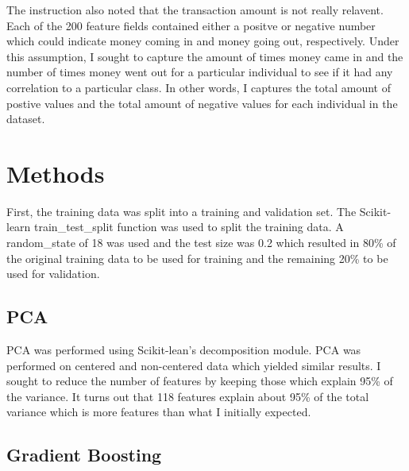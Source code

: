 \documentclass[11pt,letterpaper]{article}
\begin{document}

The instruction also noted that the transaction amount is not really relavent.
Each of the 200 feature fields contained either a positve or negative number
which could indicate money coming in and money going out, respectively.  Under
this assumption, I sought to capture the amount of times money came in and the
number of times money went out for a particular individual to see if it had any
correlation to a particular class.  In other words, I captures the total amount
of postive values and the total amount of negative values for each individual in
the dataset.  

\section{Methods}

First, the training data was split into a training and validation set.  The
Scikit-learn train\_test\_split function was used to split the training data.  A
random\_state of 18 was used and the test size was 0.2 which resulted in 80\% of
the original training data to be used for training and the remaining 20\% to be
used for validation.  

\subsection{PCA}
PCA was performed using Scikit-lean's decomposition module.  PCA was performed
on centered and non-centered data which yielded similar results.  I sought to
reduce the number of features by keeping those which explain 95\% of the
variance.  It turns out that 118 features explain about 95\% of the total
variance which is more features than what I initially expected.   

\subsection{Gradient Boosting}
\end{document}

